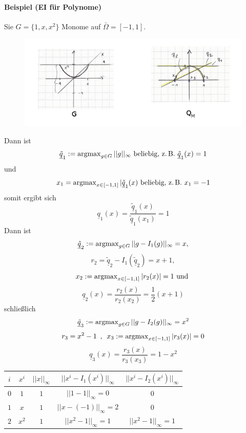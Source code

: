 \paragraph*{Beispiel (EI für Polynome)}
Sie $G= \{1,x,x^2\}$ Monome auf $\bar{\Omega} = [-1,1]$.
\begin{figure}[H]
  \centering\small
    \includegraphics[width = 0.9 \textwidth]{Bilder/EI_Polynome.png}
  \label{fig:EI_Polynome}
\end{figure}
Dann ist
\[
	\underline{\tilde{q}}_1 := \operatorname{argmax}\limits_{g \in G} ||g||_{\infty} \text{ beliebig, z.\,B. } \underline{\tilde{q}}_1(x) = 1
\]
und
\[
	x_1 = \operatorname{argmax}_{x \in [-1,1]} |\underline{\tilde{q}}_1(x) \text{ beliebig, z.\,B. } x_1 = -1
\]
somit ergibt sich 
\[
\underline{q}_1(x) = \frac{\underline{\tilde{q}}_1(x)}{\underline{\tilde{q}}_1(x_1)} = 1
\]
Dann ist
\[
	\underline{\tilde{q}}_2 := \operatorname{argmax}\limits_{g \in G} ||g - I_1(g)||_{\infty} = x,
\]
\[
	r_2 = \underline{\tilde{q}}_2 - I_1(\underline{\tilde{q}}_2) = x + 1,
\]
\[
	x_2 := \operatorname{argmax}\limits_{x \in [-1,1]} |r_2(x)| = 1 \text{ und }
\]
\[
	\underline{q}_2(x) = \frac{r_2(x)}{r_2(x_2)} = \frac{1}{2} (x+1)
\]
schließlich
\[
	\underline{\tilde{q}}_3 := \operatorname{argmax}\limits_{g \in G} ||g - I_2(g)||_{\infty} = x^2
\]
\[
	r_3 = x^2-1 \,\,\, , \,\,\, x_3 := \operatorname{argmax}\limits_{x \in [-1,1]} |r_3(x)| = 0
\]
\[
	\underline{q}_3(x) = \frac{r_3(x)}{r_3(x_3)} = 1 - x^2
\]
\begin{center}
 \begin{tabular}{|c|c|c|c|c|}
 \hline
  $i$ & $x^i$ & $||x||_{\infty}$ & $||x^i - I_1(x^i)||_{\infty}$ & $||x^i - I_2(x^i)||_{\infty}$ \\ \hline
  $0$ & $1$ & $1$ & $||1-1||_{\infty} = 0$ & $0$ \\ \hline
  $1$ & $x$ & $1$ & $||x-(-1)||_{\infty} = 2$ & $0$ \\ \hline
  $2$ & $x^2$ & $1$ & $||x^2-1||_{\infty} = 1$ & $||x^2 - 1||_{\infty} = 1$ \\ \hline
 \end{tabular}
\end{center}

